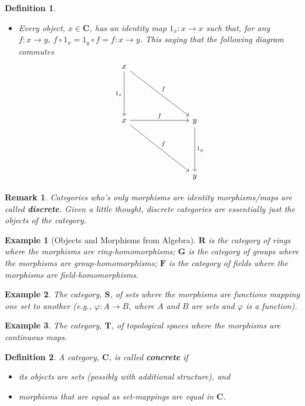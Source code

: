 \documentclass[12pt,reqno]{amsart}
\theoremstyle{plain}
\newtheorem{defi}{Definition}
\newtheorem{rem}{Remark}
\newtheorem{ex}{Example}
\newcommand{\cat}{\mathbf{C}}
\newcommand{\ca}{\mathbf}
\begin{document}
\begin{defi}
\begin{itemize}
\[\]
\item[\textup{(iiii)}] Every object, $x \in \cat$, has an identity map $1_x \colon x \to x$ such that, for any $f \colon x \to y$, $f \circ 1_x = 1_y \circ f = f \colon x \to y$. This saying that the following diagram commutes
\[
\begin{tikzcd}
x \arrow[ddd, "1_x"'] \arrow[rrrddd, "f"] &  &  &                    \\
                                        &  &  &                    \\
                                        &  &  &                    \\
x \arrow[rrrddd, "f"] \arrow[rrr, "f"]  &  &  & y \arrow[ddd, "1_y"] \\
                                        &  &  &                    \\
                                        &  &  &                    \\
                                        &  &  & y                 
\end{tikzcd}
\]
\end{itemize}
\end{defi} 
\begin{rem} Categories who's only morphisms are identity morphisms/maps are called \textbf{discrete}. Given a little thought, discrete categories are essentially just the objects of the category. 
\end{rem} 
\begin{ex}[Objects and Morphisms from Algebra] $\ca {R}$ is the category of rings where the morphisms are ring-homomorphisms; $\ca {G}$ is the category of groups where the morphisms are group-homomorphisms; $\ca {F}$ is the category of fields where the morphisms are field-homomorphisms. 
\end{ex} 
\begin{ex} The category, $\ca {S}$, of sets where the morphisms are functions mapping one set to another (e.g., $\varphi \colon A \to B$, where $A$ and $B$ are sets and $\varphi$ is a function).
\end{ex}
\begin{ex} The category, $\ca{T}$, of topological spaces where the morphisms are continuous maps. 
\end{ex} 
\begin{defi} A category, $\cat$, is called \textbf{concrete} if 
\begin{itemize}
\item[\textup{(i)}] its objects are sets (possibly with additional structure), and
\item[\textup{(ii)}] morphisms that are equal as set-mappings are equal in $\cat$. 
\end{itemize}
\end{defi} 
\end{document}
